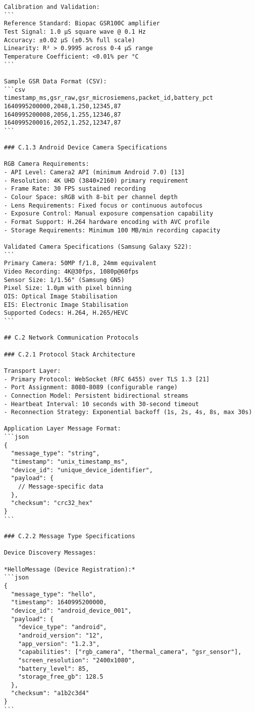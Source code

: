 \begin{verbatim}
Calibration and Validation:
```
Reference Standard: Biopac GSR100C amplifier
Test Signal: 1.0 μS square wave @ 0.1 Hz
Accuracy: ±0.02 μS (±0.5% full scale)
Linearity: R² > 0.9995 across 0-4 μS range
Temperature Coefficient: <0.01% per °C
```

Sample GSR Data Format (CSV):
```csv
timestamp_ms,gsr_raw,gsr_microsiemens,packet_id,battery_pct
1640995200000,2048,1.250,12345,87
1640995200008,2056,1.255,12346,87
1640995200016,2052,1.252,12347,87
```

### C.1.3 Android Device Camera Specifications

RGB Camera Requirements:
- API Level: Camera2 API (minimum Android 7.0) [13]
- Resolution: 4K UHD (3840×2160) primary requirement
- Frame Rate: 30 FPS sustained recording
- Colour Space: sRGB with 8-bit per channel depth
- Lens Requirements: Fixed focus or continuous autofocus
- Exposure Control: Manual exposure compensation capability
- Format Support: H.264 hardware encoding with AVC profile
- Storage Requirements: Minimum 100 MB/min recording capacity

Validated Camera Specifications (Samsung Galaxy S22):
```
Primary Camera: 50MP f/1.8, 24mm equivalent
Video Recording: 4K@30fps, 1080p@60fps
Sensor Size: 1/1.56" (Samsung GN5)
Pixel Size: 1.0μm with pixel binning
OIS: Optical Image Stabilisation
EIS: Electronic Image Stabilisation
Supported Codecs: H.264, H.265/HEVC
```

## C.2 Network Communication Protocols

### C.2.1 Protocol Stack Architecture

Transport Layer:
- Primary Protocol: WebSocket (RFC 6455) over TLS 1.3 [21]
- Port Assignment: 8080-8089 (configurable range)
- Connection Model: Persistent bidirectional streams
- Heartbeat Interval: 10 seconds with 30-second timeout
- Reconnection Strategy: Exponential backoff (1s, 2s, 4s, 8s, max 30s)

Application Layer Message Format:
```json
{
  "message_type": "string",
  "timestamp": "unix_timestamp_ms",
  "device_id": "unique_device_identifier",
  "payload": {
    // Message-specific data
  },
  "checksum": "crc32_hex"
}
```

### C.2.2 Message Type Specifications

Device Discovery Messages:

*HelloMessage (Device Registration):*
```json
{
  "message_type": "hello",
  "timestamp": 1640995200000,
  "device_id": "android_device_001",
  "payload": {
    "device_type": "android",
    "android_version": "12",
    "app_version": "1.2.3",
    "capabilities": ["rgb_camera", "thermal_camera", "gsr_sensor"],
    "screen_resolution": "2400x1080",
    "battery_level": 85,
    "storage_free_gb": 128.5
  },
  "checksum": "a1b2c3d4"
}
```


\end{verbatim}
